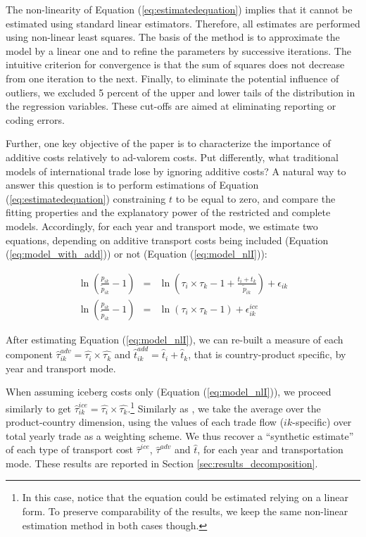 \documentclass[a4paper,11pt]{article}
\begin{document}
The non-linearity of Equation (\ref{eq:estimatedequation}) implies that it cannot be estimated using standard linear estimators. Therefore, all estimates are performed using non-linear least squares. The basis of the method is to approximate the model by a linear one and to refine the parameters by successive iterations. The intuitive criterion for convergence is that the sum of squares does not decrease from one iteration to the next. Finally, to eliminate the potential influence of outliers, we excluded 5 percent of the upper and lower tails of the distribution in the regression variables.
These cut-offs are aimed at eliminating reporting or coding errors.\medskip


Further, one key objective of the paper is to characterize the importance of additive costs relatively to ad-valorem costs. Put differently, what traditional models of international trade lose by ignoring additive costs? A natural way to answer this question is to perform estimations of Equation (\ref{eq:estimatedequation}) constraining $t$ to be equal to zero, and compare the fitting properties and the explanatory power of the restricted and complete models. Accordingly, for each year and transport mode, we estimate two equations, depending on additive transport costs being included (Equation (\ref{eq:model_with_add})) or not (Equation (\ref{eq:model_nlI})):

\begin{eqnarray}
\ln\left(\frac{p_{ik}}{\widetilde{p}_{ik}}-1 \right)&=& \ln \left(\tau_{i} \times \tau_{k}-1 +\frac{t_{i} + t_{k}}{\widetilde{p}_{ik}}\right) + \epsilon_{ik} \label{eq:model_with_add} \\
\ln\left(\frac{p_{ik}}{\widetilde{p}_{ik}}-1 \right)&=& \ln \left(\tau_{i} \times \tau_{k}-1 \right) + \epsilon^{ice}_{ik} \label{eq:model_nlI}
\end{eqnarray}

After estimating Equation (\ref{eq:model_nlI}), we can re-built a measure of each component $\widehat{\tau}^{adv}_{ik} = \widehat{\tau_{i}} \times \widehat{\tau_{k}}$ and $\widehat{t}^{add}_{ik} = \widehat{t}_{i} + \widehat{t}_{k}$, that is country-product specific, by year and transport mode.

When assuming iceberg costs only (Equation (\ref{eq:model_nlI})), we proceed similarly to get $\widehat{\tau}^{ice}_{ik} = \widehat{\tau_{i}} \times \widehat{\tau_{k}}$.\footnote{In this case, notice that the equation could be estimated relying on a linear form. To preserve comparability of the results, we keep the same non-linear estimation method in both cases though.} Similarly as \citet{Irrazabal_2015}, we take the average over the product-country dimension, using the values of each trade flow ($ik$-specific) over total yearly trade as a weighting scheme. We thus recover a ``synthetic estimate'' of each type of transport cost $\widehat{\tau}^{ice}$, $\widehat{\tau}^{adv}$ and $\widehat{t}$, for each year and transportation mode. These results are reported in Section \ref{sec:results_decomposition}.
\end{document}
